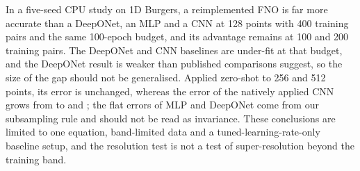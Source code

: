 In a five-seed CPU study on 1D Burgers, a reimplemented FNO is far more accurate than a DeepONet, an MLP and a CNN at 128 points with 400 training pairs and the same 100-epoch budget, and its advantage remains at 100 and 200 training pairs. The DeepONet and CNN baselines are under-fit at that budget, and the DeepONet result is weaker than published comparisons suggest, so the size of the gap should not be generalised. Applied zero-shot to 256 and 512 points, its error is unchanged, whereas the error of the natively applied CNN grows from  to  and ; the flat errors of MLP and DeepONet come from our subsampling rule and should not be read as invariance. These conclusions are limited to one equation, band-limited data and a tuned-learning-rate-only baseline setup, and the resolution test is not a test of super-resolution beyond the training band.

